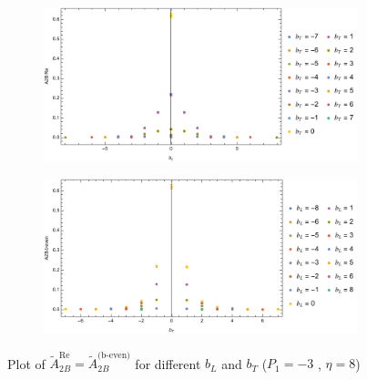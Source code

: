 \documentclass[]{article}
\numberwithin{equation}{section}
\newcommand{\tAmp}{\widetilde{A}}
\newcommand{\tAmp}{\ensuremath{\widetilde{A}^{(+)}}}
\begin{document}
\begin{figure}[h!]
     \centering
     \begin{subfigure}[b]{0.45\textwidth}
         \centering
         \includegraphics[width=\textwidth]{Amp_plots/bL_A2B_b_even_P1_-3_eta_8.pdf}
     \end{subfigure}
     \begin{subfigure}[b]{0.45\textwidth}
         \centering
         \includegraphics[width=\textwidth]{Amp_plots/bT_A2B_b_even_P1_-3_eta_8.pdf}
     \end{subfigure}
        \caption{Plot of  $\tAmp^{\text{Re}}_{2B}=\tAmp^{\text{(b-even)}}_{2B}$ for different $b_{L}$ and $b_{T}$  ($P_{1} = -3$ , $\eta=8$)}
\end{figure}
\end{document}

